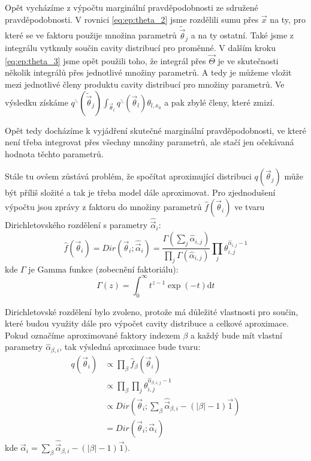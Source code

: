 Opět vycházíme z výpočtu marginální pravděpodobnosti ze sdružené
pravděpodobnosti. V rovnici \eqref{eq:ep:theta_2} jsme rozdělili sumu přes
$\vec{x}$ na ty, pro které se ve faktoru použije množina parametrů
$\tilde{\vec{\theta}}_j$ a na ty ostatní. Také jsme z integrálu vytknuly součin
cavity distribucí pro proměnné. V dalším kroku \eqref{eq:ep:theta_3} jsme opět
použili toho, že integrál přes $\vec{\Theta}$ je ve skutečnosti několik
integrálů přes jednotlivé množiny parametrů. A tedy je můžeme vložit mezi
jednotlivé členy produktu cavity distribucí pro množiny parametrů. Ve výsledku
získáme $q^\backslash(\tilde{\vec{\theta}}_j) \int_{\vec{\theta}_l}
q^\backslash(\vec{\theta}_l) \theta_{l, x_0}$ a pak zbylé členy, které zmizí.

Opět tedy docházíme k vyjádření skutečné marginální pravděpodobnosti, ve které
není třeba integrovat přes všechny množiny parametrů, ale stačí jen očekávaná
hodnota těchto parametrů.

Stále tu ovšem zůstává problém, že spočítat aproximující distribuci
$q(\vec{\theta}_j)$ může být příliš složité a tak je třeba model dále
aproximovat. Pro zjednodušení výpočtu jsou zprávy z faktoru do množiny
parametrů $\hat{f}(\vec{\theta}_i)$ ve tvaru Dirichletovského rozdělení s
parametry $\hat{\vec{\alpha}}_i$:
\begin{equation}
    \hat{f}(\vec{\theta}_i) = Dir(\vec{\theta}_i; \hat{\vec{\alpha}}_i) =
    \frac{\Gamma (\sum_j \hat{\alpha}_{i,j})}{\prod_j
    \Gamma(\hat{\alpha}_{i,j})} \prod_j \theta_{i,j}^{\hat\alpha_{i,j} - 1}
\end{equation}
kde $\Gamma$ je Gamma funkce (zobecnění faktoriálu):
\begin{equation}
    \Gamma(z) = \int_0^\infty \! t^{z-1} \exp(-t) \mathrm{d}t
\end{equation}

Dirichletovské rozdělení bylo zvoleno, protože má důležité vlastnosti pro
součin, které budou využity dále pro výpočet cavity distribuce a celkové
aproximace. Pokud označíme aproximované faktory indexem $\beta$ a každý bude
mít vlastní parametry $\hat\alpha_{\beta, i}$, tak výsledná aproximace bude
tvaru:
\begin{align}
q(\vec{\theta}_i) &\propto \prod_\beta \hat{f}_{\beta}(\vec{\theta}_i) \\
&\propto \prod_\beta \prod_j \theta_{i,j}^{\hat\alpha_{\beta,i,j} - 1} \\
&\propto Dir(\vec{\theta}_i; \sum_\beta \hat{\vec{\alpha}}_{\beta,i} -
    (|\beta| - 1) \vec{1}) \\
&= Dir(\vec{\theta}_i; \vec{\alpha}_i) \label{eq:ep:aprx_1}
\end{align}
kde $\vec{\alpha}_i = \sum_\beta \hat{\vec{\alpha}}_{\beta,i} - (|\beta| - 1)
\vec{1})$.

